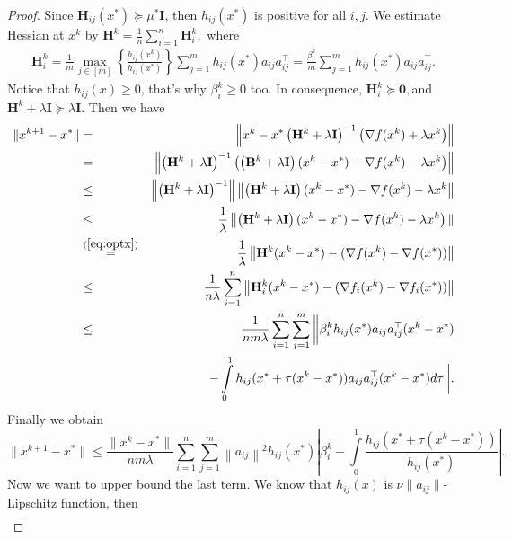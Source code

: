 \documentclass[12pt]{article}
\newcommand{\newalpha}{h}
\newcommand{\mH}{\mathbf{H}}
\newcommand{\mI}{\mathbf{I}}
\begin{document}
\begin{proof}
	Since $\mH_{ij}(x^*) \succeq \mu^*\mI$, then $\newalpha_{ij}(x^*)$ is positive for all $i,j$. We estimate Hessian at $x^k$ by $\mH^k = \frac{1}{n}\sum\limits_{i=1}^n\mH_i^k,$ where 
	\begin{eqnarray*}
		\mH_i^k = \frac{1}{m}\max_{j \in [m]}\left\{\frac{\newalpha_{ij}(x^k)}{\newalpha_{ij}(x^*)}\right\}\sum\limits_{j=1}^m\newalpha_{ij}(x^*)a_{ij}a_{ij}^\top = \frac{\beta^k_i}{m}\sum\limits_{j=1}^m\newalpha_{ij}(x^*)a_{ij}a_{ij}^\top. 
	\end{eqnarray*}
	Notice that $h_{ij}(x) \geq 0$, that's why $\beta_i^k \geq 0$ too. In consequence, $\mH_i^k \succeq \mathbf{0}, $and $\mH^k+\lambda\mI  \succeq \lambda\mI$. Then we have
	\begin{eqnarray*}
		\|x^{k+1}-x^*\| & = & \left\|x^k-x^*\left(\mH^k+\lambda\mI\right)^{-1}\left(\nabla f(x^k) + \lambda x^k\right)\right\|\\
		&=&\left\|\left(\mH^k+\lambda\mI\right)^{-1}\left(\left(\mathbf{B}^k+\lambda\mathbf{I}\right)(x^k-x^*)-\nabla f(x^k) - \lambda x^k\right)\right\|\\
		&\leq & \left\|\left(\mH^k+\lambda\mI\right)^{-1}\right\|\left\|\left(\mH^k+\lambda\mI\right)(x^k-x^*)-\nabla f(x^k) - \lambda x^k\right\|\\
		&\leq & \frac{1}{\lambda}\left\|\left(\mH^k+\lambda\mI\right)(x^k-x^*)-\nabla f(x^k) - \lambda x^k\right)\|\\
		&\overset{(\ref{eq:optx})}{=}& \frac{1}{\lambda}\left\|\mH^k(x^k-x^*) - (\nabla f(x^k) -\nabla f(x^*))\right\| \\
		&\leq&\frac{1}{n\lambda}\sum\limits_{i=1}^n\left\|\mH_i^k(x^k-x^*) -(\nabla f_i(x^k) - \nabla f_i(x^*))\right\|\\
		&\leq&\frac{1}{nm\lambda}\sum\limits_{i=1}^n\sum\limits_{j=1}^m\bigg\|\beta_i^k\newalpha_{ij}(x^*)a_{ij}a_{ij}^\top(x^k-x^*)\\
		&&\quad -\int\limits_0^1\newalpha_{ij}(x^*+\tau(x^k-x^*))a_{ij}a_{ij}^\top(x^k-x^*) d\tau\bigg\|.
	\end{eqnarray*}
	Finally we obtain
	\begin{equation}
		\label{originalmaxnewton1}
		\|x^{k+1}-x^*\| \leq  \frac{\|x^k-x^*\|}{nm\lambda}\sum\limits_{i=1}^n\sum\limits_{j=1}^m\left\|a_{ij}\right\|^2\newalpha_{ij}(x^*)\left|\beta_i^k-\int\limits_0^1\frac{\newalpha_{ij}(x^*+\tau(x^k-x^*))}{\newalpha_{ij}(x^*)}\right|.
	\end{equation}
	Now we want to upper bound the last term. We know that $\newalpha_{ij}(x)$ is $\nu\|a_{ij}\|$-Lipschitz function, then \begin{eqnarray*}

\end{eqnarray*}
\end{proof}
\end{document}
